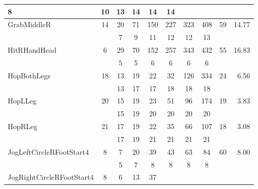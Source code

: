\begin{table}[t]
\begin{center}
\begin{tabular}{|l|c|*{6}{c}|c|r|}
{\tiny    8} & {\tiny   10} & {\tiny   13} & {\tiny   14} & {\tiny   14} & {\tiny   14} & & \\
\hline \multirow{2}{*}{                   GrabMiddleR} &
\multirow{2}{*}{  14} & {\tiny   20} & {\tiny   71} & {\tiny
150} & {\tiny  227} & {\tiny  323} & {\tiny  408} &
\multirow{2}{*}{    59} & \multirow{2}{*}{ 14.77} \\ & &
{\tiny    7} & {\tiny    9} & {\tiny   11} & {\tiny   12} & {\tiny   12} & {\tiny   13} & & \\
\hline \multirow{2}{*}{                  HitRHandHead} &
\multirow{2}{*}{   6} & {\tiny   29} & {\tiny   70} & {\tiny
152} & {\tiny  257} & {\tiny  343} & {\tiny  432} &
\multirow{2}{*}{    55} & \multirow{2}{*}{ 16.83} \\ & &
{\tiny    5} & {\tiny    5} & {\tiny    6} & {\tiny    6} & {\tiny    6} & {\tiny    6} & & \\
\hline \multirow{2}{*}{              HopBothLegs} &
\multirow{2}{*}{ 18} & {\tiny   13} & {\tiny   19} & {\tiny
22} & {\tiny   32} & {\tiny  126} & {\tiny  334} &
\multirow{2}{*}{    24} & \multirow{2}{*}{  6.56} \\ & &
{\tiny   13} & {\tiny   17} & {\tiny   17} & {\tiny   18} & {\tiny   18} & {\tiny   18} & & \\
\hline \multirow{2}{*}{                  HopLLeg} &
\multirow{2}{*}{  20} & {\tiny   15} & {\tiny   19} & {\tiny
23} & {\tiny   51} & {\tiny   96} & {\tiny  174} &
\multirow{2}{*}{    19} & \multirow{2}{*}{  3.83} \\ & &
{\tiny   15} & {\tiny   19} & {\tiny   20} & {\tiny   20} & {\tiny   20} & {\tiny   20} & & \\
\hline \multirow{2}{*}{                  HopRLeg} &
\multirow{2}{*}{  21} & {\tiny   17} & {\tiny   19} & {\tiny 22}
& {\tiny   35} & {\tiny   66} & {\tiny  107} & \multirow{2}{*}{
18} & \multirow{2}{*}{  3.08} \\ & &
{\tiny   17} & {\tiny   19} & {\tiny   21} & {\tiny   21} & {\tiny   21} & {\tiny   21} & & \\
\hline \multirow{2}{*}{     JogLeftCircleRFootStart4}&
\multirow{2}{*}{   8} & {\tiny    7} & {\tiny   20} & {\tiny
39} & {\tiny   43} & {\tiny   63} & {\tiny   84} &
\multirow{2}{*}{    60} & \multirow{2}{*}{  8.00} \\ & &
{\tiny    5} & {\tiny    7} & {\tiny    8} & {\tiny    8} & {\tiny    8} & {\tiny    8} & & \\
\hline \multirow{2}{*}{    JogRightCircleRFootStart4} &
\multirow{2}{*}{   8} & {\tiny    6} & {\tiny   13} & {\tiny 37}

\end{tabular}
\end{center}
\end{table}
